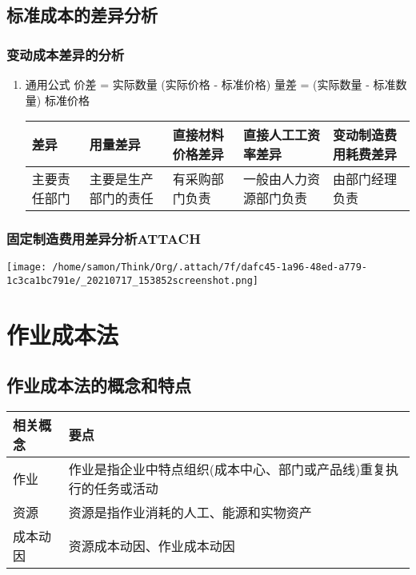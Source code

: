 \documentclass[11pt]{article}
\begin{document}
\subsection{标准成本的差异分析}
\label{sec:org6b6e704}
\subsubsection{变动成本差异的分析}
\label{sec:org108e9d2}
\begin{enumerate}
\item 通用公式
\label{sec:org77252b8}
价差 = 实际数量 \texttimes{} (实际价格 - 标准价格)
量差 = (实际数量 - 标准数量) \texttimes{} 标准价格
\begin{center}
\begin{tabular}{lllll}
差异 & 用量差异 & 直接材料价格差异 & 直接人工工资率差异 & 变动制造费用耗费差异\\
\hline
主要责任部门 & 主要是生产部门的责任 & 有采购部门负责 & 一般由人力资源部门负责 & 由部门经理负责\\
\end{tabular}
\end{center}
\end{enumerate}
\subsubsection{固定制造费用差异分析\hfill{}\textsc{ATTACH}}
\label{sec:org39db60f}
\begin{center}
\texttt{[image: /home/samon/Think/Org/.attach/7f/dafc45-1a96-48ed-a779-1c3ca1bc791e/\_20210717\_153852screenshot.png]}
\end{center}

\section{作业成本法}
\label{sec:org0da0185}
\subsection{作业成本法的概念和特点}
\label{sec:org85f5adc}
\begin{center}
\begin{tabular}{ll}
相关概念 & 要点\\
\hline
作业 & 作业是指企业中特点组织(成本中心、部门或产品线)重复执行的任务或活动\\
资源 & 资源是指作业消耗的人工、能源和实物资产\\
成本动因 & 资源成本动因、作业成本动因\\
\end{tabular}
\end{center}
\end{document}
